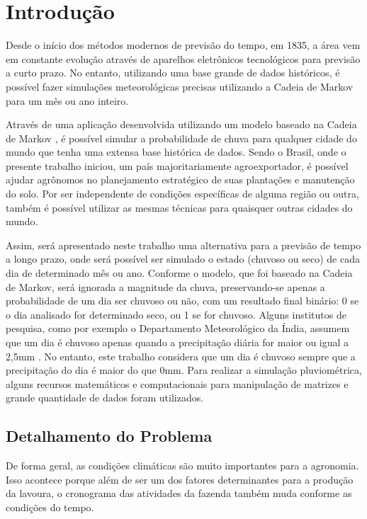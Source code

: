 \chapter{Introdução}
\label{c.introducao}

Desde o início dos métodos modernos de previsão do tempo, em 1835, a área vem em 
constante evolução através de aparelhos eletrônicos tecnológicos para previsão a curto prazo. No entanto, utilizando uma base grande de dados históricos, é possível fazer simulações meteorológicas precisas utilizando a Cadeia de Markov para um mês ou ano inteiro.

Através de uma aplicação desenvolvida utilizando um modelo baseado na Cadeia de 
Markov \cite{artigo_modelo}, é possível simular a probabilidade de chuva para qualquer cidade do mundo que tenha uma extensa base histórica de dados.
Sendo o Brasil, onde o presente trabalho iniciou, um país majoritariamente agroexportador, é possível ajudar agrônomos no planejamento estratégico de suas plantações e manutenção do solo. Por ser independente de condições específicas de alguma região ou outra, também é possível utilizar as mesmas técnicas para quaisquer outras cidades do mundo.

Assim, será apresentado neste trabalho uma alternativa para a previsão de tempo a longo prazo, onde será possível ser simulado o estado (chuvoso ou seco) de cada dia de determinado mês ou ano. Conforme o modelo, que foi baseado na Cadeia de Markov, será ignorada a magnitude da chuva, preservando-se apenas a probabilidade de um dia ser chuvoso ou não, com um resultado final binário: 0 se o dia analisado for determinado seco, ou 1 se for chuvoso. Alguns institutos de pesquisa, como por exemplo o Departamento Meteorológico da Índia, assumem que um dia é chuvoso apenas quando a precipitação diária for maior ou igual a 2,5mm \cite{imd_rainfall}. No entanto, este trabalho considera que um dia é chuvoso sempre que a precipitação do dia é maior do que 0mm. Para realizar a simulação pluviométrica, alguns recursos matemáticos e computacionais para manipulação de matrizes e grande quantidade de dados foram utilizados.

\section{Detalhamento do Problema} %
\label{s.detalhamento}

De forma geral, as condições climáticas são muito importantes para a agronomia. Isso acontece porque além de ser um dos fatores determinantes para a produção da lavoura, o cronograma das atividades da fazenda também muda conforme as condições do tempo.

